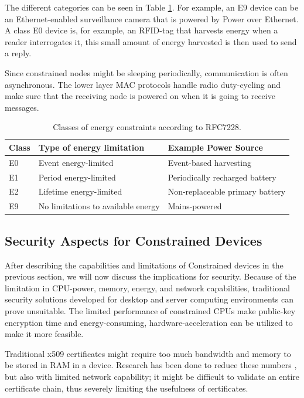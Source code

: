 The different categories can be seen in Table \ref{tab:energy-constraints}. For example, an E9 device can be an Ethernet-enabled surveillance camera that is powered by Power over Ethernet. A class E0 device is, for example, an RFID-tag that harvests energy when a reader interrogates it, this small amount of energy harvested is then used to send a reply. 

Since constrained nodes might be sleeping periodically, communication is often asynchronous. The lower layer MAC protocols handle radio duty-cycling and make sure that the receiving node is powered on when it is going to receive messages.


\begin{table}[ht]
\centering
\caption{Classes of energy constraints according to RFC7228.}
\label{tab:energy-constraints}
\begin{tabular}{lll}
\hline\hline
\textbf{Class} & \textbf{Type of energy limitation}  & \textbf{Example Power Source}                               \\ \hline
E0    & Event energy-limited                      & Event-based harvesting                             \\ 
E1    & Period energy-limited                     & Periodically recharged battery                   \\ 
E2    & Lifetime energy-limited                   & Non-replaceable primary battery                    \\ 
E9    & No limitations to available energy           & Mains-powered                                      \\ \hline\hline
\end{tabular}
\end{table}

\subsection{Security Aspects for Constrained Devices}
After describing the capabilities and limitations of Constrained devices in the previous section, we will now discuss the implications for security.
Because of the limitation in CPU-power, memory, energy, and network capabilities, traditional security solutions developed for desktop and server computing environments can prove unsuitable. The limited performance of constrained CPUs make public-key encryption time and energy-consuming, hardware-acceleration can be utilized to make it more feasible.

Traditional x509 certificates might require too much bandwidth and memory to be stored in RAM in a device. Research has been done to reduce these numbers \cite{forsby2017lightweight}, but also with limited network capability; it might be difficult to validate an entire certificate chain, thus severely limiting the usefulness of certificates.

